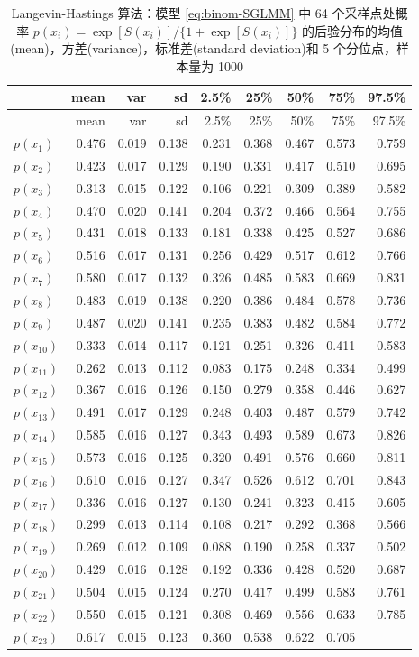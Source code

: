 \documentclass[12pt,a4paper,UTF8,twoside]{book}
\theoremstyle{definition}
\theoremstyle{definition}
\theoremstyle{definition}
\theoremstyle{remark}
\begin{document}
\begin{longtable}[]{@{}lrrrrrrrr@{}}
\caption{\label{tab:LH-binom-SGLMM} Langevin-Hastings 算法：模型
\eqref{eq:binom-SGLMM} 中 64 个采样点处概率
\(p(x_i) = \exp[S(x_i)]/\{1 + \exp[S(x_i)]\}\)
的后验分布的均值(mean)，方差(variance)，标准差(standard deviation)和 5
个分位点，样本量为 1000}\tabularnewline
\toprule
& mean & var & sd & 2.5\% & 25\% & 50\% & 75\% & 97.5\%\tabularnewline
\midrule
\endfirsthead
\toprule
& mean & var & sd & 2.5\% & 25\% & 50\% & 75\% & 97.5\%\tabularnewline
\midrule
\endhead
\(p(x_{1})\) & 0.476 & 0.019 & 0.138 & 0.231 & 0.368 & 0.467 & 0.573 &
0.759\tabularnewline
\(p(x_{2})\) & 0.423 & 0.017 & 0.129 & 0.190 & 0.331 & 0.417 & 0.510 &
0.695\tabularnewline
\(p(x_{3})\) & 0.313 & 0.015 & 0.122 & 0.106 & 0.221 & 0.309 & 0.389 &
0.582\tabularnewline
\(p(x_{4})\) & 0.470 & 0.020 & 0.141 & 0.204 & 0.372 & 0.466 & 0.564 &
0.755\tabularnewline
\(p(x_{5})\) & 0.431 & 0.018 & 0.133 & 0.181 & 0.338 & 0.425 & 0.527 &
0.686\tabularnewline
\(p(x_{6})\) & 0.516 & 0.017 & 0.131 & 0.256 & 0.429 & 0.517 & 0.612 &
0.766\tabularnewline
\(p(x_{7})\) & 0.580 & 0.017 & 0.132 & 0.326 & 0.485 & 0.583 & 0.669 &
0.831\tabularnewline
\(p(x_{8})\) & 0.483 & 0.019 & 0.138 & 0.220 & 0.386 & 0.484 & 0.578 &
0.736\tabularnewline
\(p(x_{9})\) & 0.487 & 0.020 & 0.141 & 0.235 & 0.383 & 0.482 & 0.584 &
0.772\tabularnewline
\(p(x_{10})\) & 0.333 & 0.014 & 0.117 & 0.121 & 0.251 & 0.326 & 0.411 &
0.583\tabularnewline
\(p(x_{11})\) & 0.262 & 0.013 & 0.112 & 0.083 & 0.175 & 0.248 & 0.334 &
0.499\tabularnewline
\(p(x_{12})\) & 0.367 & 0.016 & 0.126 & 0.150 & 0.279 & 0.358 & 0.446 &
0.627\tabularnewline
\(p(x_{13})\) & 0.491 & 0.017 & 0.129 & 0.248 & 0.403 & 0.487 & 0.579 &
0.742\tabularnewline
\(p(x_{14})\) & 0.585 & 0.016 & 0.127 & 0.343 & 0.493 & 0.589 & 0.673 &
0.826\tabularnewline
\(p(x_{15})\) & 0.573 & 0.016 & 0.125 & 0.320 & 0.491 & 0.576 & 0.660 &
0.811\tabularnewline
\(p(x_{16})\) & 0.610 & 0.016 & 0.127 & 0.347 & 0.526 & 0.612 & 0.701 &
0.843\tabularnewline
\(p(x_{17})\) & 0.336 & 0.016 & 0.127 & 0.130 & 0.241 & 0.323 & 0.415 &
0.605\tabularnewline
\(p(x_{18})\) & 0.299 & 0.013 & 0.114 & 0.108 & 0.217 & 0.292 & 0.368 &
0.566\tabularnewline
\(p(x_{19})\) & 0.269 & 0.012 & 0.109 & 0.088 & 0.190 & 0.258 & 0.337 &
0.502\tabularnewline
\(p(x_{20})\) & 0.429 & 0.016 & 0.128 & 0.192 & 0.336 & 0.428 & 0.520 &
0.687\tabularnewline
\(p(x_{21})\) & 0.504 & 0.015 & 0.124 & 0.270 & 0.417 & 0.499 & 0.583 &
0.761\tabularnewline
\(p(x_{22})\) & 0.550 & 0.015 & 0.121 & 0.308 & 0.469 & 0.556 & 0.633 &
0.785\tabularnewline
\(p(x_{23})\) & 0.617 & 0.015 & 0.123 & 0.360 & 0.538 & 0.622 & 0.705 &

\end{longtable}
\end{document}
